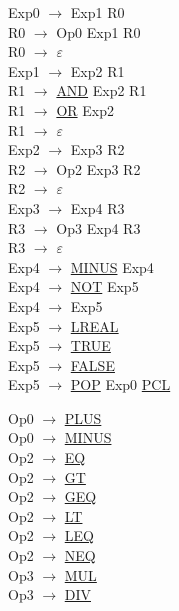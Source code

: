 \documentclass[\main/MemoriaPL.tex]{subfiles}
\begin{document}
    \begin{center}
      \begin{minipage}{.5\textwidth}
        Exp0 $\rightarrow$ Exp1 R0\\
        R0 $\rightarrow$ Op0 Exp1 R0\\
        R0 $\rightarrow$ $\varepsilon$\\
        Exp1 $\rightarrow$ Exp2 R1\\
        R1 $\rightarrow$ \underline{AND} Exp2 R1\\
        R1 $\rightarrow$ \underline{OR} Exp2\\
        R1 $\rightarrow$ $\varepsilon$\\
        Exp2 $\rightarrow$ Exp3 R2\\
        R2 $\rightarrow$ Op2 Exp3 R2\\
        R2 $\rightarrow$ $\varepsilon$\\
        Exp3 $\rightarrow$ Exp4 R3\\
        R3 $\rightarrow$ Op3 Exp4 R3\\
        R3 $\rightarrow$ $\varepsilon$\\
        Exp4 $\rightarrow$ \underline{MINUS} Exp4\\
        Exp4 $\rightarrow$ \underline{NOT} Exp5\\
        Exp4 $\rightarrow$ Exp5\\
        Exp5 $\rightarrow$ \underline{LREAL}\\
        Exp5 $\rightarrow$ \underline{TRUE}\\
        Exp5 $\rightarrow$ \underline{FALSE}\\
        Exp5 $\rightarrow$ \underline{POP} Exp0 \underline{PCL}
      \end{minipage}%
      \begin{minipage}{.5\textwidth}
        Op0 $\rightarrow$ \underline{PLUS}\\
        Op0 $\rightarrow$ \underline{MINUS}\\
        Op2 $\rightarrow$ \underline{EQ}\\
        Op2 $\rightarrow$ \underline{GT}\\
        Op2 $\rightarrow$ \underline{GEQ}\\
        Op2 $\rightarrow$ \underline{LT}\\
        Op2 $\rightarrow$ \underline{LEQ}\\
        Op2 $\rightarrow$ \underline{NEQ}\\
        Op3 $\rightarrow$ \underline{MUL}\\
        Op3 $\rightarrow$ \underline{DIV}\\
      \end{minipage}
    \end{center}
\end{document}
